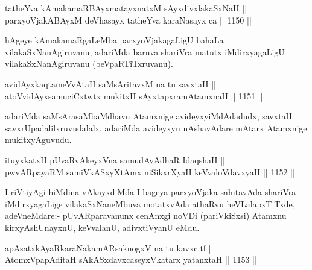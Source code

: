 
\begin{shl}
tatheYva kAmakamaRBAyxmatayxnatxM sAyxdivxlakaSxNaH || \\
parxyoVjakABAyxM deVhasayx tatheYva karaNasayx ca \hfill || 1150 ||  
\end{shl}

\begin{artha}
hAgeye kAmakamaRgaLeMba parxyoVjakagaLigU bahaLa vilakaSxNanAgiruvanu, adariMda baruva shariVra matutx iMdirxyagaLigU vilakaSxNanAgiruvanu (beVpaRTiTxruvanu).
\end{artha}

\begin{shl}
avidAyxkaqtameVvAtaH saMsAritavxM na tu savxtaH || \\
atoV\s vidAyxsamuciCxtwtx mukitxH sAyxtapxramAtamxnaH \hfill || 1151 ||  
\end{shl}

\begin{artha}
adariMda saMsArasaMbaMdhavu Atamxnige avideyxyiMdAdadudx, savxtaH savxrUpadalilxruvudalalx, adariMda avideyxyu nAshavAdare mAtarx Atamxnige mukitxyAguvudu.
\end{artha}

\begin{shl}
ituyxkatxH \footnotemark[1]pUvaRvAkeyxVna samudAyAdhaR IdaqshaH || \\
pwvARpayaRM samiVkASxyX\s \s tAmx niSikxrXyaH keVvaloV\s davxyaH \hfill || 1152 ||  
\end{shl}

\begin{artha}
I riVtiyAgi hiMdina vAkayxdiMda I bageya parxyoVjaka sahitavAda shariVra iMdirxyagaLige vilakaSxNaneMbuva motatxvAda athaRvu heVLalapxTiTxde, adeVneMdare:-
pUvARparavanunx cenAnxgi noVDi (pariVkiSxsi) Atamxnu kirxyAshUnayxnU, keVvalanU, adivxtiVyanU eMdu.
\end{artha}


\begin{shl}
apAsatxkAyaRkaraNakamARsaknogxV na tu kavxcitf || \\
AtomxVpapAditaH sAkASxdavxcaseyxVkatarx yatanxtaH \hfill || 1153 ||  
\end{shl}
				
